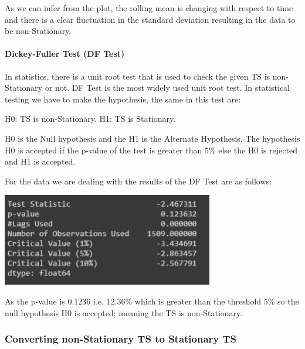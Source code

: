 			As we can infer from the plot, the rolling mean is changing with respect to time and there is a clear fluctuation in the standard deviation resulting in the data to be non-Stationary.

		\paragraph{Dickey-Fuller Test (DF Test)}

		In statistics, there is a unit root test that is used to check the given TS is non-Stationary or not. DF Test \cite{18} is the most widely used unit root test. In statistical testing we have to make the hypothesis, the same in this test are:

H0:	TS is non-Stationary.
H1:	TS is Stationary.

H0 is the Null hypothesis and the H1 is the Alternate Hypothesis. The hypothesis H0 is accepted if the p-value of the test is greater than 5\% else the H0 is rejected and H1 is accepted.

For the data we are dealing with the results of the DF Test are as follows:

		\begin{center}
		\includegraphics[width=\linewidth]{figures/DF-Test-Results-for-moving-average-of-Closing-price.jpg}	
		\label{fig: DF Test Results for moving average of Closing price}
		\end{center}
	
		As the p-value is 0.1236 i.e. 12.36\% which is greater than the threshold 5\% so the null hypothesis H0 is accepted; meaning the TS is non-Stationary.

	\subsubsection{Converting non-Stationary TS to Stationary TS}
	
